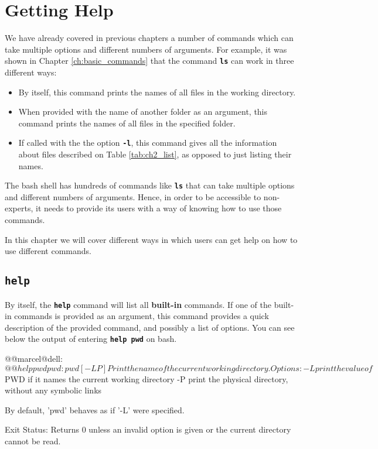 \chapter{Getting Help}\label{ch:getting_help}
We have already covered in previous chapters a number of commands which can take multiple options and different numbers of arguments. For example, it was shown in Chapter \ref{ch:basic_commands} that the command \textbf{\texttt{ls}} can work in three different ways:

\begin{itemize}
  \item By itself, this command prints the names of all files in the working directory.
  \item When provided with the name of another folder as an argument, this command prints the names of all files in the specified folder.
  \item If called with the the option \textbf{\texttt{-l}}, this command gives all the information about files described on Table \ref{tab:ch2_list}, as opposed to just listing their names.
\end{itemize}

The bash shell has hundreds of commands like \textbf{\texttt{ls}} that can take multiple options and different numbers of arguments. Hence, in order to be accessible to non-experts, it needs to provide its users with a way of knowing how to use those commands.

In this chapter we will cover different ways in which users can get help on how to use different commands.

\section{\textbf{\texttt{help}}}

By itself, the \textbf{\texttt{help}} command will list all \textbf{built-in} commands. If one of the built-in commands is provided as an argument, this command provides a quick description of the provided command, and possibly a list of options. You can see below the output of entering \textbf{\texttt{help pwd}} on bash.

\begin{command_line}[make]
@@marcel@dell:~$@@ help pwd
pwd: pwd [-LP]
    Print the name of the current working directory.

    Options:
      -L	print the value of $PWD if it names the current working directory
      -P	print the physical directory, without any symbolic links

    By default, 'pwd' behaves as if '-L' were specified.

    Exit Status:
    Returns 0 unless an invalid option is given or the current directory cannot be read.\end{command_line}

